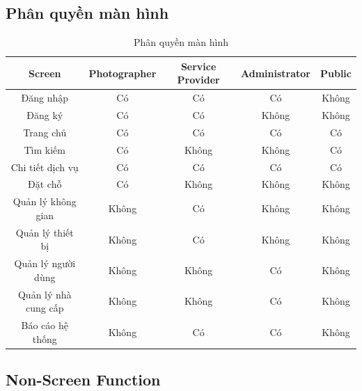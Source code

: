 \subsection{Phân quyền màn hình}
\begin{table}[H]
	\centering
	\begin{tabular}{|c|c|c|c|c|}
		\hline
		\textbf{Screen} & \textbf{Photographer} & \textbf{Service Provider} & \textbf{Administrator} & \textbf{Public} \\
		\hline
		Đăng nhập & Có & Có & Có & Không \\
		\hline
		Đăng ký & Có & Có & Không & Không \\
		\hline
		Trang chủ & Có & Có & Có & Có \\
		\hline
		Tìm kiếm & Có & Không & Không & Có \\
		\hline
		Chi tiết dịch vụ & Có & Có & Có & Có \\
		\hline
		Đặt chỗ & Có & Không & Không & Không \\
		\hline
		Quản lý không gian & Không & Có & Không & Không \\
		\hline
		Quản lý thiết bị & Không & Có & Không & Không \\
		\hline
		Quản lý người dùng & Không & Không & Có & Không \\
		\hline
		Quản lý nhà cung cấp & Không & Không & Có & Không \\
		\hline
		Báo cáo hệ thống & Không & Có & Có & Không \\
		\hline
	\end{tabular}
	\caption{Phân quyền màn hình}
	\label{tab:screen-authorization}
\end{table}
\subsection{Non-Screen Function}

